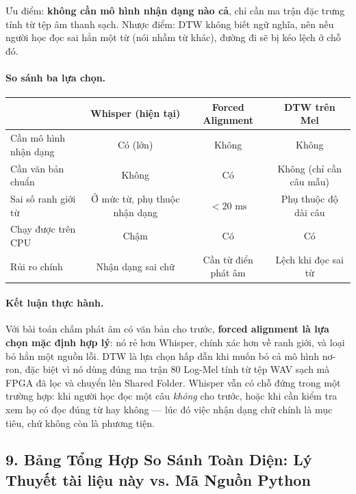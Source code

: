 \documentclass[11pt,a4paper]{article}
\begin{document}
Ưu điểm: \textbf{không cần mô hình nhận dạng nào cả}, chỉ cần ma trận đặc trưng tính từ tệp âm thanh sạch. Nhược điểm: DTW không biết ngữ nghĩa, nên nếu người học đọc sai hẳn một từ (nói nhầm từ khác), đường đi sẽ bị kéo lệch ở chỗ đó.

\paragraph{So sánh ba lựa chọn.}
\begin{center}
\small
\begin{tabular}{@{}lccc@{}}
\toprule
 & \textbf{Whisper (hiện tại)} & \textbf{Forced Alignment} & \textbf{DTW trên Mel} \\ \midrule
Cần mô hình nhận dạng & Có (lớn) & Không & Không \\
Cần văn bản chuẩn & Không & Có & Không (chỉ cần câu mẫu) \\
Sai số ranh giới từ & Ở mức từ, phụ thuộc nhận dạng & $< 20\text{ ms}$ & Phụ thuộc độ dài câu \\
Chạy được trên CPU & Chậm & Có & Có \\
Rủi ro chính & Nhận dạng sai chữ & Cần từ điển phát âm & Lệch khi đọc sai từ \\
\bottomrule
\end{tabular}
\end{center}

\paragraph{Kết luận thực hành.}
Với bài toán chấm phát âm có văn bản cho trước, \textbf{forced alignment là lựa chọn mặc định hợp lý}: nó rẻ hơn Whisper, chính xác hơn về ranh giới, và loại bỏ hẳn một nguồn lỗi. DTW là lựa chọn hấp dẫn khi muốn bỏ cả mô hình nơ-ron, đặc biệt vì nó dùng đúng ma trận 80 Log-Mel tính từ tệp WAV sạch mà FPGA đã lọc và chuyển lên Shared Folder. Whisper vẫn có chỗ đứng trong một trường hợp: khi người học đọc một câu \emph{không} cho trước, hoặc khi cần kiểm tra xem họ có đọc đúng từ hay không --- lúc đó việc nhận dạng chữ chính là mục tiêu, chứ không còn là phương tiện.

\subsection*{9. Bảng Tổng Hợp So Sánh Toàn Diện: Lý Thuyết tài liệu này vs. Mã Nguồn Python}
\end{document}
